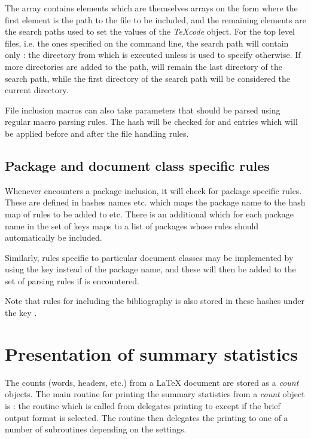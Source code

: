 \documentclass{article}
\newcommand\Obj[1]{\textsl{#1}}
\begin{document}
The  array contains elements which are themselves arrays on the form  where the first element is the path to the file to be included, and the remaining elements are the search paths used to set the  values of the \Obj{TeXcode} object. For the top level files, i.e. the ones specified on the command line, the search path will contain only : the directory from which \TeXcount{} is executed unless  is used to specify otherwise. If more directories are added to the path,  will remain the last directory of the search path, while the first directory of the search path will be considered the current directory.

File inclusion macros can also take parameters that should be parsed using regular macro parsing rules. The  hash will be checked for  and  entries which will be applied before and after the file handling rules.


\subsection{Package and document class specific rules}

Whenever \TeXcount{} encounters a package inclusion, it will check for package specific rules. These are defined in hashes names  etc. which maps the package name to the hash map of rules to be added to  etc. There is an additional  which for each package name in the set of keys maps to a list of packages whose rules should automatically be included.

Similarly, rules specific to particular document classes may be implemented by using the key  instead of the package name, and these will then be added to the set of parsing rules if  is encountered.

Note that rules for including the bibliography is also stored in these hashes under the key .



\section{Presentation of summary statistics}

The counts (words, headers, etc.) from a \LaTeX{} document are stored as a \Obj{count} objects. The main routine for printing the summary statistics from a \Obj{count} object is : the routine  which is called from  delegates printing to  except if the brief output format is selected. The  routine then delegates the printing to one of a number of subroutines depending on the settings.
\end{document}
